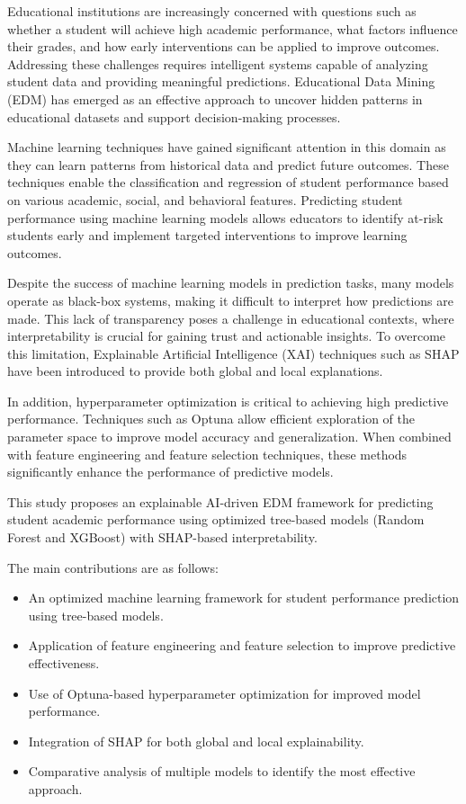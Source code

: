\documentclass[12pt,a4paper]{article}
\begin{document}
Educational institutions are increasingly concerned with questions such as whether a student will achieve high academic performance, what factors influence their grades, and how early interventions can be applied to improve outcomes. Addressing these challenges requires intelligent systems capable of analyzing student data and providing meaningful predictions. Educational Data Mining (EDM) has emerged as an effective approach to uncover hidden patterns in educational datasets and support decision-making processes.

Machine learning techniques have gained significant attention in this domain as they can learn patterns from historical data and predict future outcomes. These techniques enable the classification and regression of student performance based on various academic, social, and behavioral features. Predicting student performance using machine learning models allows educators to identify at-risk students early and implement targeted interventions to improve learning outcomes.

Despite the success of machine learning models in prediction tasks, many models operate as black-box systems, making it difficult to interpret how predictions are made. This lack of transparency poses a challenge in educational contexts, where interpretability is crucial for gaining trust and actionable insights. To overcome this limitation, Explainable Artificial Intelligence (XAI) techniques such as SHAP have been introduced to provide both global and local explanations.

In addition, hyperparameter optimization is critical to achieving high predictive performance. Techniques such as Optuna allow efficient exploration of the parameter space to improve model accuracy and generalization. When combined with feature engineering and feature selection techniques, these methods significantly enhance the performance of predictive models.

This study proposes an explainable AI-driven EDM framework for predicting student academic performance using optimized tree-based models (Random Forest and XGBoost) with SHAP-based interpretability.

The main contributions are as follows:
\begin{itemize}[leftmargin=1.5em]
	\item An optimized machine learning framework for student performance prediction using tree-based models.
	\item Application of feature engineering and feature selection to improve predictive effectiveness.
	\item Use of Optuna-based hyperparameter optimization for improved model performance.
	\item Integration of SHAP for both global and local explainability.
	\item Comparative analysis of multiple models to identify the most effective approach.
\end{itemize}
\end{document}
